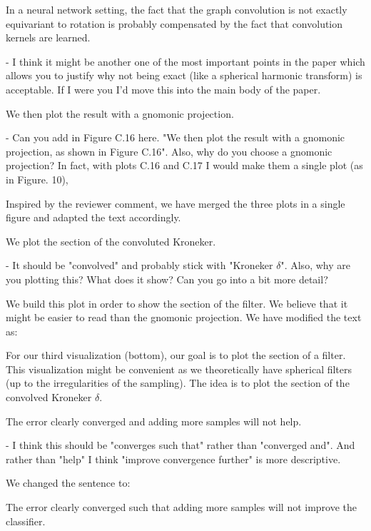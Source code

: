 \documentclass[12pt,a4paper]{article}
\newcommand{\nati}[1]{{\color[rgb]{.1,.6,.1}{NP: #1}}}
\newcommand{\todo}[1]{{\color[rgb]{.6,.1,.6}{TODO: #1}}}
\newcommand{\1}{\b{1}}              %
\newcommand{\0}{\b{0}}              %
\begin{document}
\begin{mdframed}[style=comment] 
In a neural network setting, the fact that the graph convolution is not exactly equivariant to rotation is probably compensated by the fact that convolution kernels are learned.

- I think it might be another one of the most important points in the paper which allows you to justify why not being exact (like a spherical harmonic transform) is acceptable. If I were you I'd move this into the main body of the paper.
\end{mdframed}
\todo{Assign: @all, \nati{What do you think? I had the feeling we already have that in the main body of the paper. I cannot remember where, though.}}

\begin{mdframed}[style=comment] 
We then plot the result with a gnomonic projection.

- Can you add in Figure C.16 here. "We then plot the result with a gnomonic projection, as shown in Figure C.16". Also, why do you choose a gnomonic projection? In fact, with plots C.16 and C.17 I would make them a single plot (as in Figure. 10),
\end{mdframed}
Inspired by the reviewer comment, we have merged the three plots in a single figure and adapted the text accordingly.

\begin{mdframed}[style=comment] 
We plot the section of the convoluted Kroneker.

- It should be "convolved" and probably stick with "Kroneker $\delta$". Also, why are you plotting this? What does it show? Can you go into a bit more detail?
\end{mdframed}
We build this plot in order to show the section of the filter. We believe that it might be easier to read than the gnomonic projection. We have modified the text as:
\begin{mdframed}[style=manuscript] 
For our third visualization (bottom), our goal is to plot the section of a filter. This visualization might be convenient as we theoretically have spherical filters (up to the irregularities of the sampling). The idea is to plot the section of the convolved Kroneker $\delta$.
\end{mdframed}

\begin{mdframed}[style=comment] 
The error clearly converged and adding more samples will not help.

- I think this should be "converges such that" rather than "converged and". And rather than "help" I think "improve convergence further" is more descriptive.
\end{mdframed}
We changed the sentence to:
\begin{mdframed}[style=manuscript] 
The error clearly converged such that adding more samples will not improve the classifier.
\end{mdframed}
\end{document}

